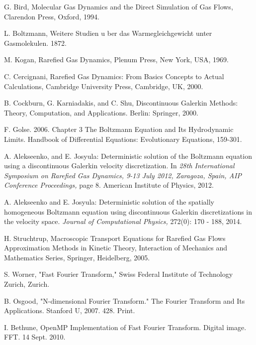 \documentclass[12pt]{CSUNthesis}
\begin{document}
\clearpage
{}
\begin{footnotesize}
\begin{thebibliography}{100}

 G. Bird, Molecular Gas Dynamics and the Direct Simulation of Gas Flows, Clarendon Press, Oxford, 1994.

 L. Boltzmann, Weitere Studien u ber das Warmegleichgewicht unter Gasmolekulen. 1872.

 M. Kogan, Rarefied Gas Dynamics, Plenum Press, New York, USA, 1969.

 C. Cercignani, Rarefied Gas Dynamics: From Basics Concepts to Actual Calculations, Cambridge University Press, Cambridge, UK, 2000.

 B. Cockburn, G. Karniadakis, and C. Shu, Discontinuous Galerkin Methods: Theory, Computation, and Applications. Berlin: Springer, 2000.

 F. Golse. 2006. Chapter 3 The Boltzmann Equation and Its Hydrodynamic Limits. Handbook of Differential Equations: Evolutionary Equations, 159-301.

 A. Alekseenko, and E. Josyula: Deterministic solution of the Boltzmann equation using a discontinuous Galerkin velocity discretization. In \textit{28th International Symposium on Rarefied Gas Dynamics, 9-13 July  2012, Zaragoza, Spain, AIP Conference Proceedings,} page 8. American Institute of Physics, 2012.

 A. Alekseenko and E. Josyula: Deterministic solution of the spatially homogeneous Boltzmann equation using discontinuous Galerkin discretizations in the velocity space. \textit{Journal of Computational Physics,} 272(0): 170 - 188, 2014. 

 H. Struchtrup, Macroscopic Transport Equations for Rarefied Gas Flows Approximation Methods in Kinetic Theory, Interaction of Mechanics and Mathematics Series, Springer, Heidelberg, 2005.

 S. Worner, "Fast Fourier Transform," Swiss Federal Institute of Technology Zurich, Zurich.

 B. Osgood, "N-dimensional Fourier Transform." The Fourier Transform and Its Applications. Stanford U, 2007. 428. Print.

 I. Bethune, OpenMP Implementation of Fast Fourier Transform. Digital image. FFT. 14 Sept. 2010.


\end{thebibliography}
\end{footnotesize}
\end{document}

